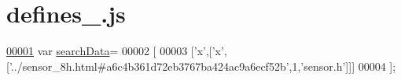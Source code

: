 \hypertarget{defines__12_8js_source}{}\section{defines\+\_.\+js}
\label{defines__12_8js_source}

\begin{DoxyCode}
\hypertarget{defines__12_8js_source.tex_l00001}{}\hyperlink{defines__12_8js_ad01a7523f103d6242ef9b0451861231e}{00001} var \hyperlink{defines__12_8js_ad01a7523f103d6242ef9b0451861231e}{searchData}=
00002 [
00003   [\textcolor{charliteral}{'x'},[\textcolor{charliteral}{'x'},[\textcolor{stringliteral}{'../sensor\_8h.html#a6c4b361d72eb3767ba424ac9a6ecf52b'},1,\textcolor{stringliteral}{'sensor.h'}]]]
00004 ];
\end{DoxyCode}
